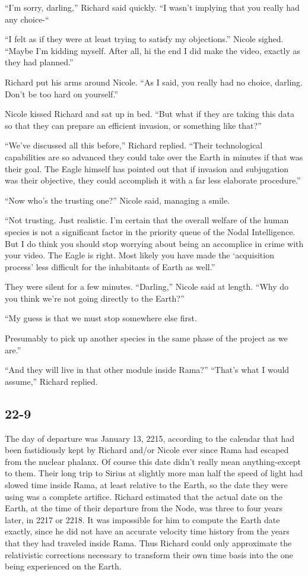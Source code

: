 \documentclass[]{article}
\begin{document}
{“I’m sorry, darling,” Richard said quickly. “I wasn’t implying that you really had any choice-“

“I felt as if they were at least trying to satisfy my objections.” Nicole sighed. “Maybe I’m kidding myself. After all, hi the end I did make the video, exactly as they had planned.”

Richard put his arms around Nicole. “As I said, you really had no choice, darling. Don’t be too hard on yourself.”

Nicole kissed Richard and sat up in bed. “But what if they are taking this data so that they can prepare an efficient invasion, or something like that?”

“We’ve discussed all this before,” Richard replied. “Their technological capabilities are so advanced they could take over the Earth in minutes if that was their goal. The Eagle himself has pointed out that if invasion and subjugation was their objective, they could accomplish it with a far less elaborate procedure.”

“Now who’s the trusting one?” Nicole said, managing a smile.

“Not trusting. Just realistic. I’m certain that the overall welfare of the human species is not a significant factor in the priority queue of the Nodal Intelligence. But I do think you should stop worrying about being an accomplice in crime with your video. The Eagle is right. Most likely you have made the ‘acquisition process’ less difficult for the inhabitants of Earth as well.”

They were silent for a few minutes. “Darling,” Nicole said at length. “Why do you think we’re not going directly to the Earth?”

“My guess is that we must stop somewhere else first.

Presumably to pick up another species in the same phase of the project as we are.”

“And they will live in that other module inside Rama?” “That’s what I would assume,” Richard replied.

\subsection{22-9}

The day of departure was January 13, 2215, according to the calendar that had been fastidiously kept by Richard and/or Nicole ever since Rama had escaped from the nuclear phalanx. Of course this date didn’t really mean anything-except to them. Their long trip to Sirius at slightly more man half the speed of light had slowed time inside Rama, at least relative to the Earth, so the date they were using was a complete artifice. Richard estimated that the actual date on the Earth, at the time of their departure from the Node, was three to four years later, in 2217 or 2218. It was impossible for him to compute the Earth date exactly, since he did not have an accurate velocity time history from the years that they had traveled inside Rama. Thus Richard could only approximate the relativistic corrections necessary to transform their own time basis into the one being experienced on the Earth.

}
\end{document}
